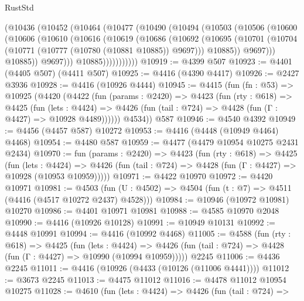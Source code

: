 \begin{lexlean}{RustStd}
\begin{coremodule}
            (@10436
              (@10452
                (@10464
                  (@10477
                    (@10490
                      (@10494
                        (@10503
                          (@10506
                            (@10600
                              (@10606
                                (@10610
                                  (@10616
                                    (@10619
                                      (@10686
                                        (@10692
                                          (@10695
                                            (@10701
                                              (@10704
                                                (@10771 (@10777 (@10780 (@10881 @10885)) @9697)))
                                              @10885))
                                          @9697)))
                                    @10885))
                                @9697)))
                          @10885)))))))))))
@10919 := @4399 @507
@10923 := @4401 (@4405 @507) (@4411 @507)
@10925 := @4416 (@4390 @4417)
@10926 := @2427 @3936
@10928 := @4416 (@10926 @4444)
@10945 := @4415
    (fun (fn : @53) =>
    @10925
      (@4420
        (@4422
          (fun (params : @2420) =>
          @4423
            (fun (rty : @618) =>
            @4425
              (fun (lets : @4424) =>
              @4426 (fun (tail : @724) => @4428 (fun (Γ : @4427) => @10928 @4489))))))
        @4534))
    @587
@10946 := @4540 @4392
@10949 := @4456 (@4457 @587) @10272
@10953 := @4416 (@4448 (@10949 @4464) @4468)
@10954 := @4480 @587
@10959 := @4477 (@4479 @10954 @10275 @2431 @2434)
@10970 := fun (params : @2420) =>
  @4423
    (fun (rty : @618) =>
    @4425
      (fun (lets : @4424) =>
      @4426 (fun (tail : @724) => @4428 (fun (Γ : @4427) => @10928 (@10953 @10959)))))
@10971 := @4422 @10970
@10972 := @4420 @10971
@10981 := @4503
    (fun (U : @4502) => @4504 (fun (t : @7) => @4511 (@4416 (@4517 @10272 @2437) @4528)))
@10984 := @10946 (@10972 @10981) @10270
@10986 := @4401 @10971 @10981
@10988 := @4585 @10970 @2048
@10990 := @4416 (@10926 @10128)
@10991 := @10949 @10131
@10992 := @4448 @10991
@10994 := @4416 (@10992 @4468)
@11005 := @4588
    (fun (rty : @618) =>
    @4425
      (fun (lets : @4424) =>
      @4426 (fun (tail : @724) => @4428 (fun (Γ : @4427) => @10990 (@10994 @10959)))))
    @2245
@11006 := @4436 @2245
@11011 := @4416 (@10926 (@4433 (@10126 (@11006 @4441))))
@11012 := @3673 @2245
@11013 := @4475 @11012
@11016 := @4478 @11012 @10954 @10275
@11028 := @4610
    (fun (lets : @4424) =>
    @4426
      (fun (tail : @724) =>

\end{coremodule}
\end{lexlean}
